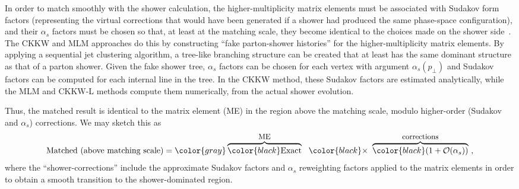 %
In order to match smoothly with the shower calculation, the
  higher-multiplicity matrix elements 
  must be associated with Sudakov form factors (representing the
  virtual corrections that would have been generated if a shower had 
  produced the same phase-space configuration), and their $\alpha_s$
  factors must be chosen so that, at least at the matching scale, 
  they become identical to the choices made on the shower
  side~\cite{Cooper:2011gk}.  
  The CKKW and MLM approaches do this by 
  constructing ``fake parton-shower histories'' for the
  higher-multiplicity matrix elements. By applying a sequential jet
  clustering algorithm, a tree-like branching structure can be
  created that at least has the same dominant structure as
  that of a parton shower. Given the fake shower tree, $\alpha_s$
  factors can be chosen for each vertex with argument
  $\alpha_s(p_\perp)$ and Sudakov factors can be
  computed for each internal line in the tree. In the CKKW method,
  these Sudakov factors are estimated analytically, while the MLM and CKKW-L
  methods compute them numerically, from the actual shower
  evolution.
  
  Thus, the matched result is identical
  to the matrix element (ME) in the region above the matching scale, 
  modulo higher-order (Sudakov and $\alpha_s$) corrections. We may
  sketch this as  
\begin{equation}
\mbox{Matched (above matching scale)} =
\color{gray}\overbrace{\color{black}\mbox{Exact}}^{\small\mbox{ME}}~
\ {\color{black}\times} \ \overbrace{\color{black}(1 +
\mathcal{O}(\alpha_s))}^{\small\mbox{corrections}} \label{eq:scalebased1}~,
\end{equation}
where the ``shower-corrections'' include the approximate Sudakov factors
and $\alpha_s$ 
reweighting factors applied to the matrix elements in order to obtain
a smooth transition to the shower-dominated region.

